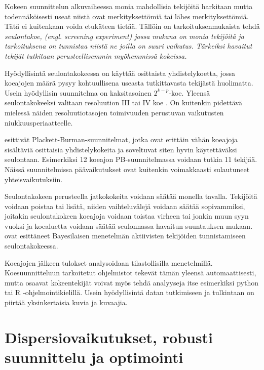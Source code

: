 \documentclass[12pt,a4paper,finnish]{tutthesis}
\begin{document}
Kokeen suunnittelun alkuvaiheessa monia mahdollisia tekijöitä harkitaan
mutta todennäköisesti useat niistä ovat merkityksettömiä tai lähes
merkityksettömiä. Tätä ei kuitenkaan voida etukäteen tietää. Tällöin
on tarkoituksenmukaista tehdä \em seulontakoe, \em
(engl. \em screening experiment\em) jossa mukana on monia tekijöitä
ja tarkoituksena on tunnistaa niistä ne joilla on suuri vaikutus.
Tärkeiksi havaitut tekijät tutkitaan perusteellisemmin myöhemmissä
kokeissa.

Hyödyllisintä seulontakokeessa on käyttää osittaista
yhdistelykoetta, jossa koeajojen määrä pysyy kohtuullisena
useasta tutkittavasta tekijästä huolimatta.
Usein hyödyllisin suunnitelma on kaksitasoinen \(2^{k - p}\)-koe.
Yleensä seulontakokeeksi valitaan
resoluution III tai IV koe \parencite[s.~9]{montgomery2006}.
On kuitenkin pidettävä mielessä näiden resoluutiotasojen
toimivuuden perustuvan vaikutusten niukkuusperiaatteelle.

\textcite{plackett1946} esittivät Plackett-Burman-suunnitelmat,
jotka ovat erittäin vähän koeajoja sisältäviä osittaisia yhdistelykokeita
ja soveltuvat siten hyvin käytettäväksi seulontaan. Esimerkiksi 12 koeajon
PB-suunnitelmassa voidaan tutkia 11 tekijää. Näissä suunnitelmissa
päävaikutukset ovat kuitenkin voimakkaasti sulautuneet yhteisvaikutuksiin.



Seulontakokeen perusteella jatkokokeita voidaan säätää monella tavalla.
Tekijöitä voidaan poistaa tai lisätä, niiden vaihteluvälejä voidaan
säätää sopivammiksi, joitakin seulontakokeen koeajoja voidaan toistaa
virheen tai jonkin muun syyn vuoksi ja koealuetta voidaan säätää
seulonnassa havaitun suuntauksen mukaan.
\textcite{box1993} ovat esittäneet Bayesilaisen menetelmän
aktiivisten tekijöiden tunnistamiseen seulontakokeessa.



Koeajojen jälkeen tulokset analysoidaan tilastollisilla menetelmillä.
Koesuunnitteluun tarkoitetut ohjelmistot tekevät tämän yleensä
automaattisesti, mutta osaavat kokeentekijät voivat myös tehdä
analyyseja itse esimerkiksi python tai R -ohjelmointikielillä.
Usein hyödyllisintä datan tutkimiseen ja tulkintaan on
piirtää yksinkertaisia kuvia ja kuvaajia.



\section{Dispersiovaikutukset, robusti suunnittelu ja optimointi}
\end{document}
